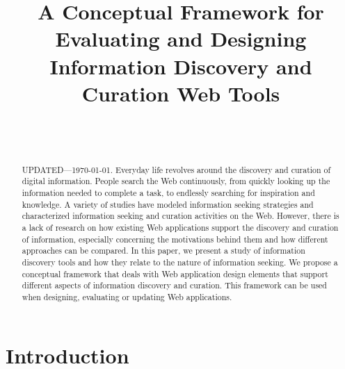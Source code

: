 \documentclass{sigchi}
\begin{document}
\title{A Conceptual Framework for Evaluating and Designing Information Discovery and Curation Web Tools}

\author{%
  \\
  \\
}

\maketitle

\begin{abstract}
  UPDATED---\today. Everyday life revolves around the discovery and curation of digital information. People search the Web continuously, from quickly looking up the information needed to complete a task, to endlessly searching for inspiration and knowledge. A variety of studies have modeled information seeking strategies and characterized information seeking and curation activities on the Web. However, there is a lack of research on how existing Web applications support the discovery and curation of information, especially concerning the motivations behind them and how different approaches can be compared. In this paper, we present a study of information discovery tools and how they relate to the nature of information seeking. We propose a conceptual framework that deals with Web application design elements that support different aspects of information discovery and curation. This framework can be used when designing, evaluating or updating Web applications.
\end{abstract}

\keywords{
  }

 

\section{Introduction}
\end{document}
